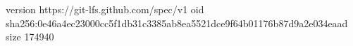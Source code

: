 version https://git-lfs.github.com/spec/v1
oid sha256:0e46a4ec23000cc5f1db31c3385ab8ea5521dce9f64b01176b87d9a2e034eaad
size 174940

